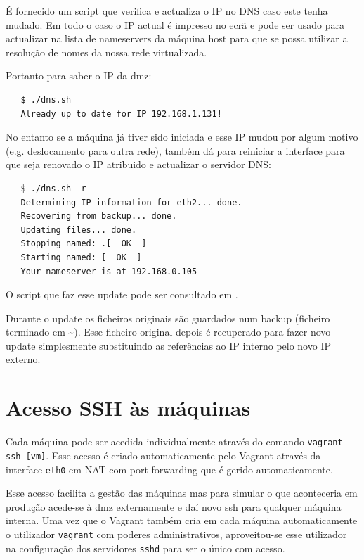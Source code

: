 \documentclass[12pt,a4paper]{report}
\begin{document}
É fornecido um script que verifica e actualiza o IP no DNS caso este tenha mudado. Em todo o caso o IP actual é impresso no ecrã e pode ser usado para actualizar na lista de nameservers da máquina host para que se possa utilizar a resolução de nomes da nossa rede virtualizada.

Portanto para saber o IP da dmz:

\begin{verbatim}
   $ ./dns.sh
   Already up to date for IP 192.168.1.131!
\end{verbatim}

No entanto se a máquina já tiver sido iniciada e esse IP mudou por algum motivo (e.g. deslocamento para outra rede), também dá para reiniciar a interface para que seja renovado o IP atribuido e actualizar o servidor DNS:

\begin{verbatim}
   $ ./dns.sh -r
   Determining IP information for eth2... done.
   Recovering from backup... done.
   Updating files... done.
   Stopping named: .[  OK  ]
   Starting named: [  OK  ]
   Your nameserver is at 192.168.0.105
\end{verbatim}

O script que faz esse update pode ser consultado em .

Durante o update os ficheiros originais são guardados num backup (ficheiro terminado em \textasciitilde). Esse ficheiro original depois é recuperado para fazer novo update simplesmente substituindo as referências ao IP interno pelo novo IP externo.

\section{Acesso SSH às máquinas}

Cada máquina pode ser acedida individualmente através do comando \texttt{vagrant ssh [vm]}. Esse acesso é criado automaticamente pelo Vagrant através da interface \texttt{eth0} em NAT com port forwarding que é gerido automaticamente.

Esse acesso facilita a gestão das máquinas mas para simular o que aconteceria em produção acede-se à dmz externamente e daí novo ssh para qualquer máquina interna. Uma vez que o Vagrant também cria em cada máquina automaticamente o utilizador \texttt{vagrant} com poderes administrativos, aproveitou-se esse utilizador na configuração dos servidores \texttt{sshd} para ser o único com acesso.
\end{document}
